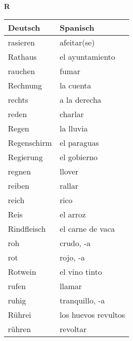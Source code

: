 \begin{flushright}\begin{Huge}\textbf{R}\end{Huge}\end{flushright}

\begin{longtable}{p{} p{}} 
\textbf{Deutsch}     & \textbf{Spanisch}                                       \\ \hline
\hline
\endhead %
rasieren & afeitar(se)\\
Rathaus & el ayuntamiento\\
rauchen & fumar\\
Rechnung & la cuenta\\
rechts & a la derecha\\
reden & charlar\\
Regen & la lluvia\\
Regenschirm & el paraguas\\
Regierung & el gobierno\\
regnen & llover\\
reiben & rallar\\
reich & rico\\
Reis & el arroz\\
Rindfleisch & el carne de vaca\\
roh & crudo, -a\\
rot & rojo, -a\\
Rotwein & el vino tinto \\
rufen & llamar \\
ruhig & tranquillo, -a\\
Rührei & los huevos revultos\\
rühren & revoltar\\

\end{longtable}
